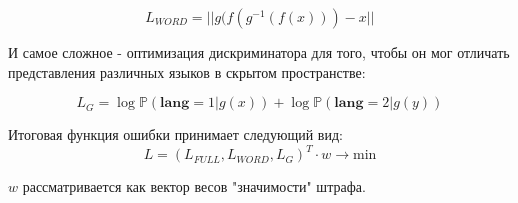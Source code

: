 \documentclass[12pt,twoside]{article}
\begin{document}
$$L_{WORD} = ||g(f(g^{-1}(f(x))) - x||$$

И самое сложное - оптимизация дискриминатора для того, чтобы он мог отличать представления различных языков в скрытом пространстве:

$$L_{G} = \log \mathbb{P}(\textbf{lang} = 1| g(x)) + \log \mathbb{P}(\textbf{lang} = 2|g(y))$$

Итоговая функция ошибки принимает следующий вид:
$$L = (L_{FULL}, L_{WORD}, L_{G})^T \cdot w \to \text{min}$$

$w$ рассматривается как вектор весов "значимости" штрафа.






\end{document}
